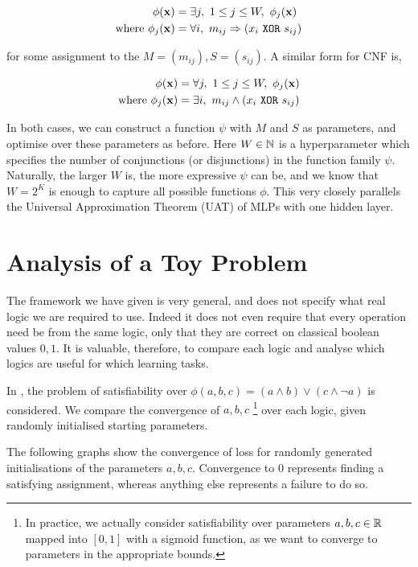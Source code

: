 $$
\begin{aligned}
\phi(\mathbf{x}) &= \exists j,\ 1 \leq j \leq W,\ \phi_j(\mathbf{x}) \\
\text{where } \phi_j(\mathbf{x}) &= \forall i,\ m_{ij} \Rightarrow (x_i \ \texttt{XOR}\  s_{ij})
\end{aligned}
$$

for some assignment to the $M = (m_{ij}), S = (s_{ij})$. A similar form for CNF is,

$$
\begin{aligned}
\phi(\mathbf{x}) &= \forall j,\ 1 \leq j \leq W,\ \phi_j(\mathbf{x}) \\
\text{where } \phi_j(\mathbf{x}) &= \exists i,\ m_{ij} \land (x_i \ \texttt{XOR}\  s_{ij})
\end{aligned}
$$

In both cases, we can construct a function $\psi$ with $M$ and $S$ as parameters, and optimise over these parameters as before. Here $W \in\mathbb{N}$ is a hyperparameter which specifies the number of conjunctions (or disjunctions) in the function family $\psi$. Naturally, the larger $W$ is, the more expressive $\psi$ can be, and we know that $W = 2^K$ is enough to capture all possible functions $\phi$. This very closely parallels the Universal Approximation Theorem (UAT) of MLPs with one hidden layer.

\section{Analysis of a Toy Problem}

The framework we have given is very general, and does not specify what real logic we are required to use. Indeed it does not even require that every operation need be from the same logic, only that they are correct on classical boolean values $0,1$. It is valuable, therefore, to compare each logic and analyse which logics are useful for which learning tasks.

In \cite{analyzefuzzy}, the problem of satisfiability over $\phi(a,b,c) = (a \land b) \lor (c \land \lnot a)$ is considered. We compare the convergence of $a, b, c$ \footnote{In practice, we actually consider satisfiability over parameters $a, b, c \in \mathbb{R}$ mapped into $[0,1]$ with a sigmoid function, as we want to converge to parameters in the appropriate bounds.} over each logic, given randomly initialised starting parameters.

The following graphs show the convergence of loss for  randomly generated initialisations of the parameters $a, b, c$. Convergence to $0$ represents finding a satisfying assignment, whereas anything else represents a failure to do so.

